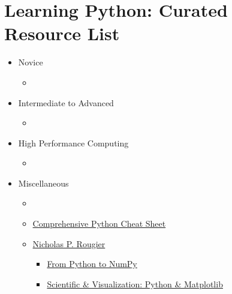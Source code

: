 \documentclass[11pt]{extarticle}
\begin{document}
\section*{Learning Python: Curated Resource List}
\begin{itemize}
  \item Novice 
    \vspace{-2mm}
    \begin{itemize}
      \item \citet{bell,luba,matt}
    \end{itemize}
  \item Intermediate to Advanced 
    \vspace{-2mm}
    \begin{itemize}
      \item \citet{ramalho,martelli,beazley_ess,cookbook,beazley_dis,slatkin}
    \end{itemize}
  \item High Performance Computing 
    \vspace{-2mm}
    \begin{itemize}
      \item \citet{ozsvald,antao}
    \end{itemize}
  \item Miscellaneous
    \vspace{-2mm}
    \begin{itemize}
      \item \citet{lerner}
      \item \href{https://github.com/gto76/python-cheatsheet}{Comprehensive Python Cheat Sheet}
      \item \href{https://github.com/rougier}{Nicholas P. Rougier} 
        \vspace{-1mm}
        \begin{itemize}
          \item \href{https://www.labri.fr/perso/nrougier/from-python-to-numpy/}{From Python to NumPy}
          \item \href{https://github.com/rougier/scientific-visualization-book}{Scientific \& Visualization: Python \& Matplotlib}
        \end{itemize}
    \end{itemize}
\end{itemize}

\newpage



\end{document}
